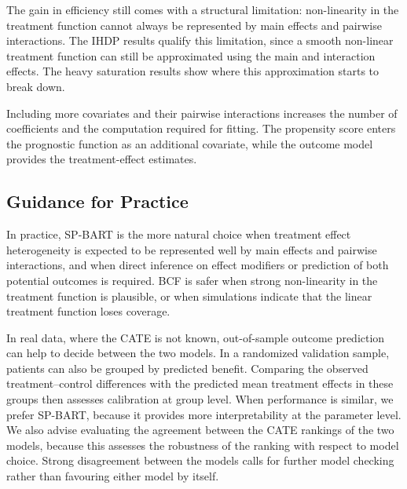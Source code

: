 \documentclass[12pt]{article}
\newcommand{\rev}[1]{\ifdefined\ReviewChanges{\color{revisionblue}#1}\else#1\fi}
\begin{document}
The gain in efficiency still comes with a structural limitation: non-linearity in the treatment function cannot always be represented by main effects and pairwise interactions. The IHDP results qualify this limitation, since a smooth non-linear treatment function can still be approximated using the main and interaction effects. The heavy saturation results show where this approximation starts to break down.

Including more covariates and their pairwise interactions increases the number of coefficients and the computation required for fitting. The propensity score enters the prognostic function as an additional covariate, while the outcome model provides the treatment-effect estimates.

\subsection{Guidance for Practice}
In practice, \rev{SP-BART} is the more natural choice when treatment effect heterogeneity is expected to be represented well by main effects and pairwise interactions, and when direct inference on effect modifiers or prediction of both potential outcomes is required. BCF is safer when strong non-linearity in the treatment function is plausible, or when simulations indicate that the linear treatment function loses coverage.

In real data, where the CATE is not known, out-of-sample outcome prediction can help to decide between the two models. In a randomized validation sample, patients can also be grouped by predicted benefit. Comparing the observed treatment--control differences with the predicted mean treatment effects in these groups then assesses calibration at group level. When performance is similar, we prefer \rev{SP-BART}, because it provides more interpretability at the parameter level. We also advise evaluating the agreement between the CATE rankings of the two models, because this assesses the robustness of the ranking with respect to model choice. Strong disagreement between the models calls for further model checking rather than favouring either model by itself.
\end{document}
